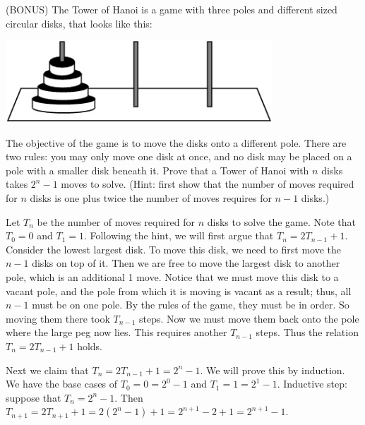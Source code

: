 \documentclass[solution, letterpaper]{cs20inclass}
\begin{document}
\problem (BONUS) The Tower of Hanoi is a game with three poles and different sized circular disks, that looks like this:
\begin{center}
\includegraphics[width=10cm]{hanoi.jpg}
\end{center}
The objective of the game is to move the disks onto a different pole. There are two rules: you may only move one disk at once, and no disk may be placed on a pole with a smaller disk beneath it. Prove that a Tower of Hanoi with $n$ disks takes $2^n-1$ moves to solve. (Hint: first show that the number of moves required for $n$ disks is one plus twice the number of moves requires for $n-1$ disks.)
\begin{solution}

Let $T_n$ be the number of moves required for $n$ disks to solve the game. Note that $T_0 = 0$ and $T_1 = 1$. Following the hint, we will first argue that $T_n = 2T_{n-1} + 1$. Consider the lowest largest disk. To move this disk, we need to first move the $n-1$ disks on top of it. Then we are free to move the largest disk to another pole, which is an additional 1 move. Notice that we must move this disk to a vacant pole, and the pole from which it is moving is vacant as a result; thus, all $n-1$ must be on one pole. By the rules of the game, they must be in order. So moving them there took $T_{n-1}$ steps. Now we must move them back onto the pole where the large peg now lies. This requires another $T_{n-1}$ steps. Thus the relation $T_n = 2T_{n-1} + 1$ holds.

Next we claim that $T_n = 2T_{n-1} + 1 = 2^n-1$. We will prove this by induction. We have the base cases of $T_0 = 0 = 2^0-1$ and $T_1 = 1 = 2^1 - 1$. Inductive step: suppose that  $T_n = 2^n-1$. Then $T_{n+1} = 2T_{n+1}+1 = 2(2^n-1)+1 = 2^{n+1} - 2  + 1 = 2^{n+1}-1$.
 
\end{solution}
\end{document}
